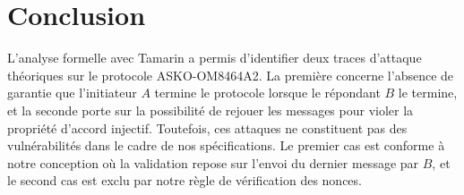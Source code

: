 \section{Conclusion}

L'analyse formelle avec Tamarin a permis d'identifier deux traces d'attaque théoriques sur le
protocole ASKO-OM8464A2. La première concerne l'absence de garantie que l'initiateur $A$ termine
le protocole lorsque le répondant $B$ le termine, et la seconde porte sur la possibilité de
rejouer les messages pour violer la propriété d'accord injectif. Toutefois, ces attaques ne
constituent pas des vulnérabilités dans le cadre de nos spécifications. Le premier cas est
conforme à notre conception où la validation repose sur l'envoi du dernier message par $B$,
et le second cas est exclu par notre règle de vérification des nonces.